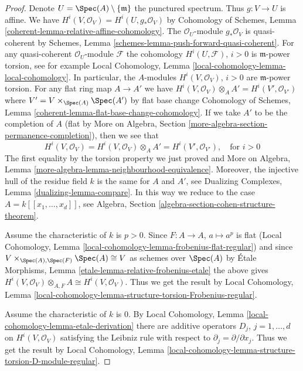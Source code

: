 \begin{proof}
Denote $U = \Spec(A) \setminus \{\mathfrak m\}$ the punctured spectrum.
Thus $g : V \to U$ is affine.
We have $H^i(V, \mathcal{O}_V) = H^i(U, g_*\mathcal{O}_V)$ by
Cohomology of Schemes, Lemma \ref{coherent-lemma-relative-affine-cohomology}.
The $\mathcal{O}_U$-module $g_*\mathcal{O}_V$ is quasi-coherent by
Schemes, Lemma \ref{schemes-lemma-push-forward-quasi-coherent}.
For any quasi-coherent $\mathcal{O}_U$-module $\mathcal{F}$
the cohomology $H^i(U, \mathcal{F})$, $i > 0$
is $\mathfrak m$-power torsion, see for example
Local Cohomology, Lemma \ref{local-cohomology-lemma-local-cohomology}.
In particular, the $A$-modules $H^i(V, \mathcal{O}_V)$, $i > 0$
are $\mathfrak m$-power torsion.
For any flat ring map $A \to A'$ we have
$H^i(V, \mathcal{O}_V) \otimes_A A' = H^i(V', \mathcal{O}_{V'})$
where $V' = V \times_{\Spec(A)} \Spec(A')$ by flat base change
Cohomology of Schemes, Lemma \ref{coherent-lemma-flat-base-change-cohomology}.
If we take $A'$ to be the completion of $A$ (flat by
More on Algebra, Section \ref{more-algebra-section-permanence-completion}),
then we see that
$$
H^i(V, \mathcal{O}_V) = H^i(V, \mathcal{O}_V) \otimes_A A' =
H^i(V', \mathcal{O}_{V'}),\quad\text{for } i > 0
$$
The first equality by the torsion property we just proved and
More on Algebra, Lemma \ref{more-algebra-lemma-neighbourhood-equivalence}.
Moreover, the injective hull of the residue field $k$
is the same for $A$ and $A'$, see
Dualizing Complexes, Lemma \ref{dualizing-lemma-compare}.
In this way we reduce to the case $A = k[[x_1, \ldots, x_d]]$, see
Algebra, Section \ref{algebra-section-cohen-structure-theorem}.

\medskip\noindent
Assume the characteristic of $k$ is $p > 0$. Since $F : A \to A$,
$a \mapsto a^p$ is flat (Local Cohomology, Lemma
\ref{local-cohomology-lemma-frobenius-flat-regular})
and since $V \times_{\Spec(A), \Spec(F)} \Spec(A) \cong V$ as schemes
over $\Spec(A)$ by
\'Etale Morphisms, Lemma \ref{etale-lemma-relative-frobenius-etale}
the above gives
$H^i(V, \mathcal{O}_V) \otimes_{A, F} A \cong H^i(V, \mathcal{O}_V)$.
Thus we get the result by
Local Cohomology, Lemma
\ref{local-cohomology-lemma-structure-torsion-Frobenius-regular}.

\medskip\noindent
Assume the characteristic of $k$ is $0$. By
Local Cohomology, Lemma \ref{local-cohomology-lemma-etale-derivation}
there are additive operators $D_j$, $j = 1, \ldots, d$ on
$H^i(V, \mathcal{O}_V)$ satisfying the Leibniz rule with
respect to $\partial_j = \partial/\partial x_j$.
Thus we get the result by
Local Cohomology,
Lemma \ref{local-cohomology-lemma-structure-torsion-D-module-regular}.
\end{proof}

